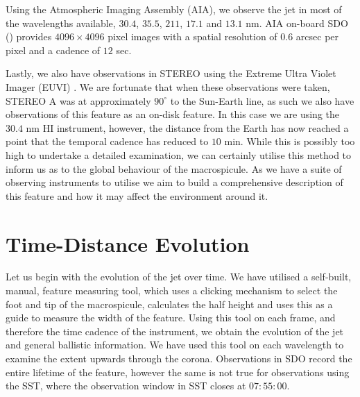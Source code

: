 Using the Atmospheric Imaging Assembly (AIA), we observe the jet in most of the wavelengths available, $30.4$, $35.5$, $211$, $17.1$ and $13.1$ nm.
AIA on-board SDO (\cite{AIAspec}) provides $4096 \times 4096$ pixel images with a spatial resolution of $0.6$ arcsec per pixel and a cadence of $12$ sec.

Lastly, we also have observations in STEREO using the Extreme Ultra Violet Imager (EUVI) \citep{Defise2001}. 
We are fortunate that when these observations were taken, STEREO A was at approximately $90^\circ$ to the Sun-Earth line, as such we also have observations of this feature as an on-disk feature.
In this case we are using the $30.4$ nm HI instrument, however, the distance from the Earth has now reached a point that the temporal cadence has reduced to $10$ min.
While this is possibly too high to undertake a detailed examination, we can certainly utilise this method to inform us as to the global behaviour of the macrospicule.
As we have a suite of observing instruments to utilise we aim to build a comprehensive description of this feature and how it may affect the environment around it.


\section{Time-Distance Evolution}
\label{time_dist_sect}

Let us begin with the evolution of the jet over time. 
We have utilised a self-built, manual, feature measuring tool, which uses a clicking mechanism to select the foot and tip of the macrospicule, calculates the half height and uses this as a guide to measure the width of the feature.
Using this tool on each frame, and therefore the time cadence of the instrument, we obtain the evolution of the jet and general ballistic information.
We have used this tool on each wavelength to examine the extent upwards through the corona. 
Observations in SDO record the entire lifetime of the feature, however the same is not true for observations using the SST, where the observation window in SST closes at $07:55:00$.

